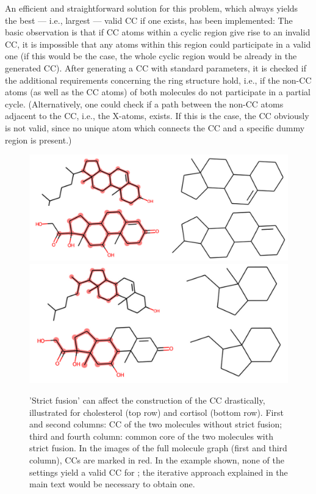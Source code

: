 An efficient and straightforward solution for this problem, which always yields the best --- i.e., largest --- valid CC if one exists, has been implemented:
The basic observation is that if CC atoms within a cyclic region give rise to an invalid CC, it is impossible that any atoms within this region could participate in a valid one (if this would be the case, the whole cyclic region would be already in the generated CC).
After generating a CC with standard parameters, it is checked if the additional requirements concerning the ring structure hold, i.e., if the non-CC atoms (as well as the CC atoms) of both molecules do not participate in a partial cycle.
(Alternatively, one could check if a path between the non-CC atoms adjacent to the CC, i.e., the X-atoms, exists. If this is the case, the CC obviously is not valid, since no unique atom which connects the CC and a specific dummy region is present.)





\begin{figure}
\includegraphics[scale=0.45]{sterols_wo_strictfusion}\includegraphics[scale=0.4]{sterols_w_strictfusion}

\caption{'Strict fusion' can affect the construction of the CC drastically, illustrated for cholesterol (top row) and cortisol (bottom row). First and second columns: CC of the two molecules without strict fusion; third and fourth column: common
core of the two molecules with strict fusion. In the images of the full molecule graph (first and third column), CCs are marked in red. In the example shown, none of the settings yield a valid CC for \trafo; the iterative approach explained in the main text would be necessary to obtain one. }
\label{fig:strictfusion}
\end{figure}




